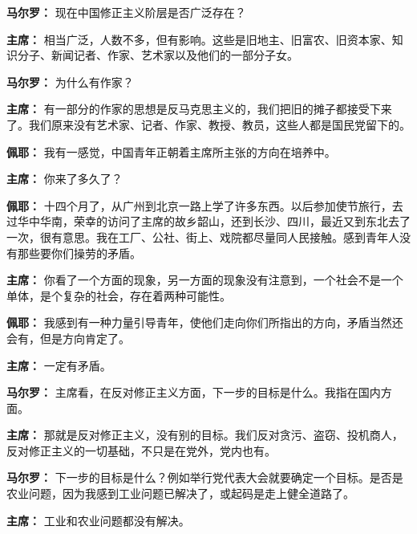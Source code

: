 \begin{duihua}
\item[\textbf{马尔罗：}] 现在中国修正主义阶层是否广泛存在？

\item[\textbf{主席：}] 相当广泛，人数不多，但有影响。这些是旧地主、旧富农、旧资本家、知识分子、新闻记者、作家、艺术家以及他们的一部分子女。

\item[\textbf{马尔罗：}] 为什么有作家？

\item[\textbf{主席：}] 有一部分的作家的思想是反马克思主义的，我们把旧的摊子都接受下来了。我们原来没有艺术家、记者、作家、教授、教员，这些人都是国民党留下的。

\item[\textbf{佩耶：}] 我有一感觉，中国青年正朝着主席所主张的方向在培养中。

\item[\textbf{主席：}] 你来了多久了？

\item[\textbf{佩耶：}] 十四个月了，从广州到北京一路上学了许多东西。以后参加使节旅行，去过华中华南，荣幸的访问了主席的故乡韶山，还到长沙、四川，最近又到东北去了一次，很有意思。我在工厂、公社、街上、戏院都尽量同人民接触。感到青年人没有那些要你们操劳的矛盾。

\item[\textbf{主席：}] 你看了一个方面的现象，另一方面的现象没有注意到，一个社会不是一个单体，是个复杂的社会，存在着两种可能性。

\item[\textbf{佩耶：}] 我感到有一种力量引导青年，使他们走向你们所指出的方向，矛盾当然还会有，但是方向肯定了。

\item[\textbf{主席：}] 一定有矛盾。

\item[\textbf{马尔罗：}] 主席看，在反对修正主义方面，下一步的目标是什么。我指在国内方面。

\item[\textbf{主席：}] 那就是反对修正主义，没有别的目标。我们反对贪污、盗窃、投机商人，反对修正主义的一切基础，不只是在党外，党内也有。

\item[\textbf{马尔罗：}] 下一步的目标是什么？例如举行党代表大会就要确定一个目标。是否是农业问题，因为我感到工业问题已解决了，或起码是走上健全道路了。

\item[\textbf{主席：}] 工业和农业问题都没有解决。


\end{duihua}
